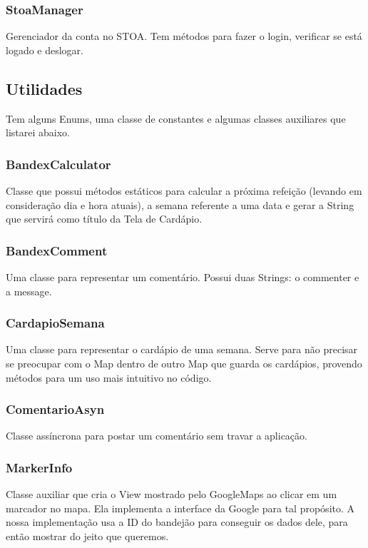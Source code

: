 \subsubsection{StoaManager}
Gerenciador da conta no STOA. Tem métodos para fazer o login, verificar se está logado e deslogar.

\subsection{Utilidades}
Tem alguns Enums, uma classe de constantes e algumas classes auxiliares que listarei abaixo.
\subsubsection{BandexCalculator}
Classe que possui métodos estáticos para calcular a próxima refeição (levando em consideração dia e hora atuais), a semana referente a uma data e gerar a String que servirá como título da Tela de Cardápio.

\subsubsection{BandexComment}
Uma classe para representar um comentário. Possui duas Strings: o commenter e a message.

\subsubsection{CardapioSemana}
Uma classe para representar o cardápio de uma semana. Serve para não precisar se preocupar com o Map dentro de outro Map que guarda os cardápios, provendo métodos para um uso mais intuitivo no código.

\subsubsection{ComentarioAsyn}
Classe assíncrona para postar um comentário sem travar a aplicação.

\subsubsection{MarkerInfo}
Classe auxiliar que cria o View mostrado pelo GoogleMaps ao clicar em um marcador no mapa. Ela implementa a interface da Google para tal propósito.
A nossa implementação usa a ID do bandejão para conseguir os dados dele, para então mostrar do jeito que queremos.




